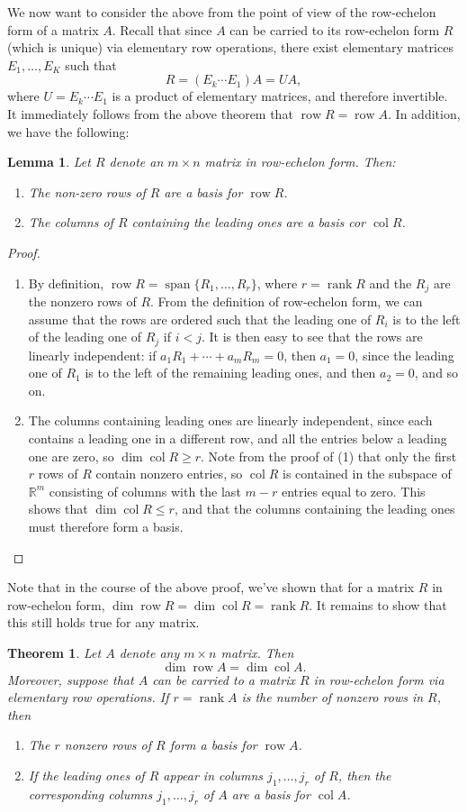 \documentclass[letterpaper,12pt]{article}
\newtheorem{theorem}{Theorem}
\newtheorem{lemma}{Lemma}
\newcommand{\R}{\mathbb{R}}
\DeclareMathOperator{\spn}{span}
\DeclareMathOperator{\col}{col}
\DeclareMathOperator{\row}{row}
\DeclareMathOperator{\rank}{rank}
\begin{document}
We now want to consider the above from the point of view of the row-echelon form of a matrix $A$. Recall that since $A$ can be carried to its row-echelon form $R$ (which is unique) via elementary row operations, there exist elementary matrices $E_1,\ldots, E_K$ such that
\[
 R = (E_k\cdots E_1)A = UA,
\]
where $U=E_k\cdots E_1$ is a product of elementary matrices, and therefore invertible. It immediately follows from the above theorem that $\row R = \row A$. In addition, we have the following:
\begin{lemma}
 Let $R$ denote an $m\times n$ matrix in row-echelon form. Then:
\begin{enumerate}
 \item The non-zero rows of $R$ are a basis for $\row R$.
 \item The columns of $R$ containing the leading ones are a basis cor $\col R$.
\end{enumerate}
\end{lemma}
\begin{proof}
 \begin{enumerate}
  \item By definition, $\row R = \spn\{R_1,\ldots, R_r\}$, where $r=\rank R$ and the $R_j$ are the nonzero rows of $R$. From the definition of row-echelon form, we can assume that the rows are ordered such that the leading one of $R_i$ is to the left of the leading one of $R_j$ if $i<j$. It is then easy to see that the rows are linearly independent: if $a_1R_1+\cdots+a_mR_m=0$, then $a_1=0$, since the leading one of $R_1$ is to the left of the remaining leading ones, and then $a_2=0$, and so on.
 \item The columns containing leading ones are linearly independent, since each contains a leading one in a different row, and all the entries below a leading one are zero, so $\dim \col R\geq r$. Note from the proof of (1) that only the first $r$ rows of $R$ contain nonzero entries, so $\col R$ is contained in the subspace of $\R^m$ consisting of columns with the last $m-r$ entries equal to zero. This shows that $\dim \col R\leq r$, and that the columns containing the leading ones must therefore form a basis.
 \end{enumerate}
\end{proof}
Note that in the course of the above proof, we've shown that for a matrix $R$ in row-echelon form, $\dim \row R = \dim \col R = \rank R$. It remains to show that this still holds true for any matrix.
\begin{theorem}\label{2}
 Let $A$ denote any $m\times n$ matrix. Then
\[
 \dim\row A = \dim \col A.
\]
Moreover, suppose that $A$ can be carried to a matrix $R$ in row-echelon form via elementary row operations. If $r=\rank A$ is the number of nonzero rows in $R$, then
\begin{enumerate}
 \item The $r$ nonzero rows of $R$ form a basis for $\row A$.
 \item If the leading ones of $R$ appear in columns $j_1,\ldots, j_r$ of $R$, then the corresponding columns $j_1,\ldots, j_r$ of $A$ are a basis for $\col A$.
\end{enumerate}
\end{theorem}
\end{document}

